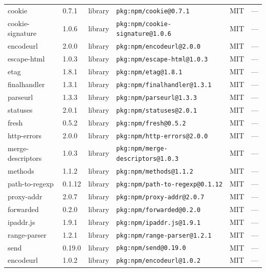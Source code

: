 \documentclass[11pt,a4paper]{article}
\begin{document}
\begin{longtable}{|p{4cm}|p{2cm}|p{1.6cm}|p{5cm}|p{1.5cm}|p{3.5cm}|}
\raggedright cookie & 0.7.1 & library & \small\texttt{pkg:npm/cookie@0.7.1} & MIT & \small — \\
\raggedright cookie-signature & 1.0.6 & library & \small\texttt{pkg:npm/cookie-signature@1.0.6} & MIT & \small — \\
\raggedright encodeurl & 2.0.0 & library & \small\texttt{pkg:npm/encodeurl@2.0.0} & MIT & \small — \\
\raggedright escape-html & 1.0.3 & library & \small\texttt{pkg:npm/escape-html@1.0.3} & MIT & \small — \\
\raggedright etag & 1.8.1 & library & \small\texttt{pkg:npm/etag@1.8.1} & MIT & \small — \\
\raggedright finalhandler & 1.3.1 & library & \small\texttt{pkg:npm/finalhandler@1.3.1} & MIT & \small — \\
\raggedright parseurl & 1.3.3 & library & \small\texttt{pkg:npm/parseurl@1.3.3} & MIT & \small — \\
\raggedright statuses & 2.0.1 & library & \small\texttt{pkg:npm/statuses@2.0.1} & MIT & \small — \\
\raggedright fresh & 0.5.2 & library & \small\texttt{pkg:npm/fresh@0.5.2} & MIT & \small — \\
\raggedright http-errors & 2.0.0 & library & \small\texttt{pkg:npm/http-errors@2.0.0} & MIT & \small — \\
\raggedright merge-descriptors & 1.0.3 & library & \small\texttt{pkg:npm/merge-descriptors@1.0.3} & MIT & \small — \\
\raggedright methods & 1.1.2 & library & \small\texttt{pkg:npm/methods@1.1.2} & MIT & \small — \\
\raggedright path-to-regexp & 0.1.12 & library & \small\texttt{pkg:npm/path-to-regexp@0.1.12} & MIT & \small — \\
\raggedright proxy-addr & 2.0.7 & library & \small\texttt{pkg:npm/proxy-addr@2.0.7} & MIT & \small — \\
\raggedright forwarded & 0.2.0 & library & \small\texttt{pkg:npm/forwarded@0.2.0} & MIT & \small — \\
\raggedright ipaddr.js & 1.9.1 & library & \small\texttt{pkg:npm/ipaddr.js@1.9.1} & MIT & \small — \\
\raggedright range-parser & 1.2.1 & library & \small\texttt{pkg:npm/range-parser@1.2.1} & MIT & \small — \\
\raggedright send & 0.19.0 & library & \small\texttt{pkg:npm/send@0.19.0} & MIT & \small — \\
\raggedright encodeurl & 1.0.2 & library & \small\texttt{pkg:npm/encodeurl@1.0.2} & MIT & \small — \\

\end{longtable}
\end{document}
